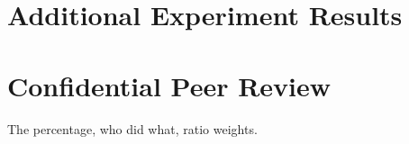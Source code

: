 \documentclass{article}
\begin{document}
\section*{Additional Experiment Results}

\section*{Confidential Peer Review} 

The percentage, who did what, ratio weights. 
\end{document}
